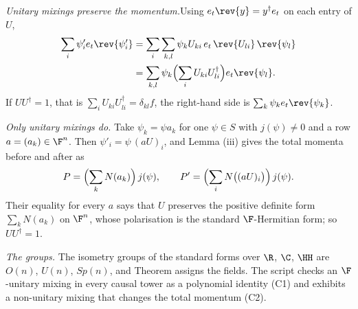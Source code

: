 \textit{Unitary mixings preserve the momentum.}\enspace Using $e_{t}\rev{y} = y^{\dagger}e_{t}$ on each entry of $U$,
\begin{align*}
\sum_{i}\psi'_{i}e_{t}\rev{\psi'_{i}} &= \sum_{i}\sum_{k,l}\psi_{k}U_{ki}\,e_{t}\,\rev{U_{li}}\,\rev{\psi_{l}} \\
&= \sum_{k,l}\psi_{k}\Bigl(\sum_{i}U_{ki}U_{li}^{\dagger}\Bigr)e_{t}\rev{\psi_{l}}.
\end{align*}
If $UU^{\dagger} = 1$, that is $\sum_{i}U_{ki}U_{li}^{\dagger} = \delta_{kl}f$, the right-hand side is $\sum_{k}\psi_{k}e_{t}\rev{\psi_{k}}$.



\emph{Only unitary mixings do.}  Take $\psi_{k} = \psi a_{k}$ for one $\psi \in S$ with $j(\psi) \neq 0$ and a row $a = (a_{k}) \in \F^{n}$. Then $\psi'_{i} = \psi\,(aU)_{i}$, and Lemma (iii) gives the total momenta before and after as
\[
P = \Bigl(\sum_{k}N(a_{k})\Bigr)\,j(\psi), \qquad P' = \Bigl(\sum_{i}N\bigl((aU)_{i}\bigr)\Bigr)\,j(\psi).
\]
Their equality for every $a$ says that $U$ preserves the positive definite form $\sum_{k}N(a_{k})$ on $\F^{n}$, whose polarisation is the standard $\F$-Hermitian form; so $UU^{\dagger} = 1$.



\emph{The groups.}  The isometry groups of the standard forms over $\R$, $\C$, $\HH$ are $O(n)$, $U(n)$, $Sp(n)$, and Theorem  assigns the fields. The script checks an $\F$-unitary mixing in every causal tower as a polynomial identity (C1) and exhibits a non-unitary mixing that changes the total momentum (C2).
